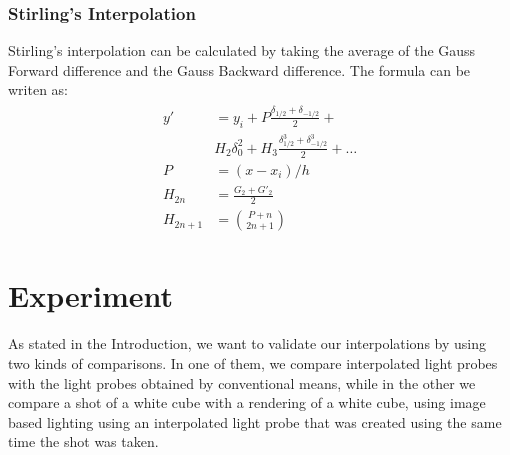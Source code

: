 \documentclass[conference]{acmsiggraph}
\begin{document}
\subsubsection{Stirling's Interpolation}
	Stirling's interpolation can be calculated by taking the average of the Gauss Forward difference and the Gauss Backward difference. The formula
can be writen as:
\begin{align}
\begin{split}
	y' &= y_i + P \frac{\delta_{1/2}+\delta_{-1/2}}{2} + \\ &H_2 \delta_0^2 + H_3 \frac{\delta^3_{1/2}+\delta^3_{-1/2}}{2} + \dots\\
	P &= (x-x_i)/h \\
	H_{2n} &= \frac{G_2 + G'_2}{2} \\
	H_{2n+1} &= \binom{P+n}{2n+1}
\end{split}
\end{align}

\section{Experiment}
	As stated in the Introduction, we want to validate our interpolations by using two kinds of comparisons. In one of them, we compare interpolated light probes with the light probes obtained by conventional means, while in the other we compare a shot of a white cube with a rendering of a white cube, using image based lighting using an interpolated light probe that was created using the same time the shot was taken.
\end{document}
